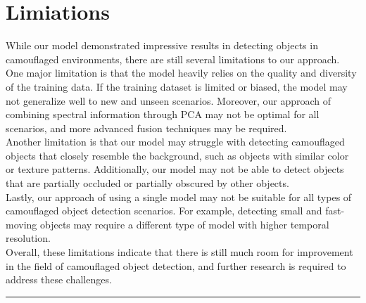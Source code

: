 \vspace{1cm}
\section{{{\fontsize{17}{21}\selectfont \textbf{Limiations}}}}
\setlength{\columnsep}{1.5cm}

\begin{multicols}{2}
While our model demonstrated impressive results in detecting objects in camouflaged environments, there are still several limitations to our approach.\\
One major limitation is that the model heavily relies on the quality and diversity of the training data. If the training dataset is limited or biased, the model may not generalize well to new and unseen scenarios. Moreover, our approach of combining spectral information through PCA may not be optimal for all scenarios, and more advanced fusion techniques may be required.\\
Another limitation is that our model may struggle with detecting camouflaged objects that closely resemble the background, such as objects with similar color or texture patterns. Additionally, our model may not be able to detect objects that are partially occluded or partially obscured by other objects.\\
Lastly, our approach of using a single model may not be suitable for all types of camouflaged object detection scenarios. For example, detecting small and fast-moving objects may require a different type of model with higher temporal resolution.\\
Overall, these limitations indicate that there is still much room for improvement in the field of camouflaged object detection, and further research is required to address these challenges.
\end{multicols}

\vspace{0.5cm}
{\color{gray}\hrule}
\vspace{0.5cm}